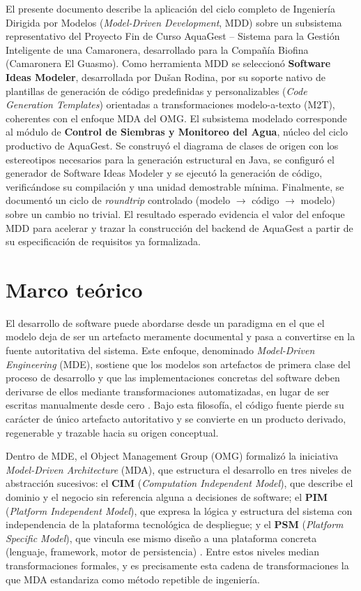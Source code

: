 \documentclass[11pt,a4paper]{article}
\newcommand{\tituloPFC}{AquaGest -- Sistema para la Gestión Inteligente de una Camaronera}
\begin{document}
El presente documento describe la aplicación del ciclo completo de Ingeniería Dirigida por Modelos (\emph{Model-Driven Development}, MDD) sobre un subsistema representativo del Proyecto Fin de Curso \tituloPFC, desarrollado para la Compañía Biofina (Camaronera El Guasmo). Como herramienta MDD se seleccionó \textbf{Software Ideas Modeler}, desarrollada por Dušan Rodina, por su soporte nativo de plantillas de generación de código predefinidas y personalizables (\emph{Code Generation Templates}) orientadas a transformaciones modelo-a-texto (M2T), coherentes con el enfoque MDA del OMG. El subsistema modelado corresponde al módulo de \textbf{Control de Siembras y Monitoreo del Agua}, núcleo del ciclo productivo de AquaGest. Se construyó el diagrama de clases de origen con los estereotipos necesarios para la generación estructural en Java, se configuró el generador de Software Ideas Modeler y se ejecutó la generación de código, verificándose su compilación y una unidad demostrable mínima. Finalmente, se documentó un ciclo de \emph{roundtrip} controlado (modelo \(\rightarrow\) código \(\rightarrow\) modelo) sobre un cambio no trivial. El resultado esperado evidencia el valor del enfoque MDD para acelerar y trazar la construcción del backend de AquaGest a partir de su especificación de requisitos ya formalizada.

\newpage

\section{Marco teórico}
\label{sec:marco-teorico}

El desarrollo de software puede abordarse desde un paradigma en el que el modelo deja de ser un artefacto meramente documental y pasa a convertirse en la fuente autoritativa del sistema. Este enfoque, denominado \emph{Model-Driven Engineering} (MDE), sostiene que los modelos son artefactos de primera clase del proceso de desarrollo y que las implementaciones concretas del software deben derivarse de ellos mediante transformaciones automatizadas, en lugar de ser escritas manualmente desde cero \citep{bucchiarone2020}. Bajo esta filosofía, el código fuente pierde su carácter de único artefacto autoritativo y se convierte en un producto derivado, regenerable y trazable hacia su origen conceptual.

Dentro de MDE, el Object Management Group (OMG) formalizó la iniciativa \emph{Model-Driven Architecture} (MDA), que estructura el desarrollo en tres niveles de abstracción sucesivos: el \textbf{CIM} (\emph{Computation Independent Model}), que describe el dominio y el negocio sin referencia alguna a decisiones de software; el \textbf{PIM} (\emph{Platform Independent Model}), que expresa la lógica y estructura del sistema con independencia de la plataforma tecnológica de despliegue; y el \textbf{PSM} (\emph{Platform Specific Model}), que vincula ese mismo diseño a una plataforma concreta (lenguaje, framework, motor de persistencia) \citep{omg_mda2014}. Entre estos niveles median transformaciones formales, y es precisamente esta cadena de transformaciones la que MDA estandariza como método repetible de ingeniería.
\end{document}
